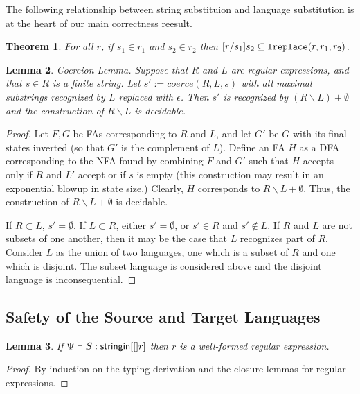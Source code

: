 \documentclass[10pt,preprint]{sigplanconf}
\newtheorem{thm}{Theorem}
\newtheorem{lem}[thm]{Lemma}
\theoremstyle{definition}
\newcommand{\stringin}[1]{{\sf stringin}[#1]}
\newcommand{\lsubst}[3]{{\tt lreplace}(#1,#2,#3)}
\begin{document}
The following relationship between string substituion and language substitution is at
the heart of our main correctness reesult.

\begin{thm}
  For all $r$, if $s_1 \in r_1$ and $s_2 \in r_2$ then 
  $\subst{r}{s_1}{s_2} \subseteq \lsubst{r}{r_1}{r_2}$.
\end{thm}

\begin{lem}{Coercion Lemma.} \label{thm:coercionalemma}
Suppose that $R$ and $L$ are regular expressions, and that $s \in R$ is a finite string.  Let $s' := coerce(R,L,s)$ with all maximal substrings recognized by $L$ replaced with $\epsilon$.  Then $s'$ is recognized by $(R \backslash L) + \emptyset$ and the construction of $R \backslash L$ is decidable.
\end{lem}
\begin{proof}
Let $F,G$ be FAs corresponding to $R$ and $L$, and let $G'$ be $G$ with its final states inverted (so that $G'$ is the complement of $L$).  Define an FA $H$ as a DFA corresponding to the NFA found by combining $F$ and $G'$ such that $H$ accepts only if $R$ and $L'$ accept or if $s$ is empty (this construction may result in an exponential blowup in state size.)  Clearly, $H$ corresponds to $R \backslash L + \emptyset$.  Thus, the construction of $R \backslash L + \emptyset$ is decidable.

If $R \subset L$, $s' = \emptyset$.  If $L \subset R$, either $s' = \emptyset$, or $s' \in R$ and $s' \not \in L$. If $R$ and $L$ are not subsets of one another, then it may be the case that $L$ recognizes part of $R$.  Consider $L$ as the union of two languages, one which is a subset of $R$ and one which is disjoint.  The subset language is considered above and the disjoint language is inconsequential.
\end{proof}


\subsection{Safety of the Source and Target Languages}


\begin{lem}
  If $\sctx \vdash S : \stringin[r]$ then $r$ is a well-formed regular expression. 
\end{lem}
\begin{proof}
  By induction on the typing derivation and the closure lemmas for regular
  expressions.
\end{proof}
\end{document}
